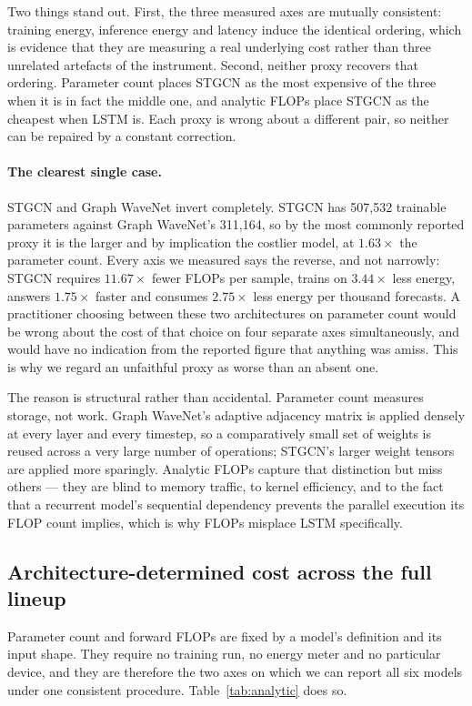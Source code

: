 \documentclass[manuscript,screen,review]{acmart}
\begin{document}
Two things stand out. First, the three measured axes are mutually consistent:
training energy, inference energy and latency induce the identical ordering,
which is evidence that they are measuring a real underlying cost rather than
three unrelated artefacts of the instrument. Second, neither proxy recovers
that ordering. Parameter count places STGCN as the most expensive of the three
when it is in fact the middle one, and analytic FLOPs place STGCN as the
cheapest when LSTM is. Each proxy is wrong about a different pair, so neither
can be repaired by a constant correction.

\paragraph{The clearest single case.} STGCN and Graph WaveNet invert
completely. STGCN has 507{,}532 trainable parameters against Graph WaveNet's
311{,}164, so by the most commonly reported proxy it is the larger and by
implication the costlier model, at $1.63\times$ the parameter count. Every
axis we measured says the reverse, and not narrowly: STGCN requires
$11.67\times$ fewer FLOPs per sample, trains on $3.44\times$ less energy,
answers $1.75\times$ faster and consumes $2.75\times$ less energy per thousand
forecasts. A practitioner choosing between these two architectures on
parameter count would be wrong about the cost of that choice on four separate
axes simultaneously, and would have no indication from the reported figure
that anything was amiss. This is why we regard an unfaithful proxy as worse
than an absent one.

The reason is structural rather than accidental. Parameter count measures
storage, not work. Graph WaveNet's adaptive adjacency matrix is applied
densely at every layer and every timestep, so a comparatively small set of
weights is reused across a very large number of operations; STGCN's larger
weight tensors are applied more sparingly. Analytic FLOPs capture that
distinction but miss others --- they are blind to memory traffic, to kernel
efficiency, and to the fact that a recurrent model's sequential dependency
prevents the parallel execution its FLOP count implies, which is why FLOPs
misplace LSTM specifically.

\subsection{Architecture-determined cost across the full lineup}
\label{sec:analytic}
Parameter count and forward FLOPs are fixed by a model's definition and its
input shape. They require no training run, no energy meter and no particular
device, and they are therefore the two axes on which we can report all six
models under one consistent procedure. Table~\ref{tab:analytic} does so.
\end{document}
